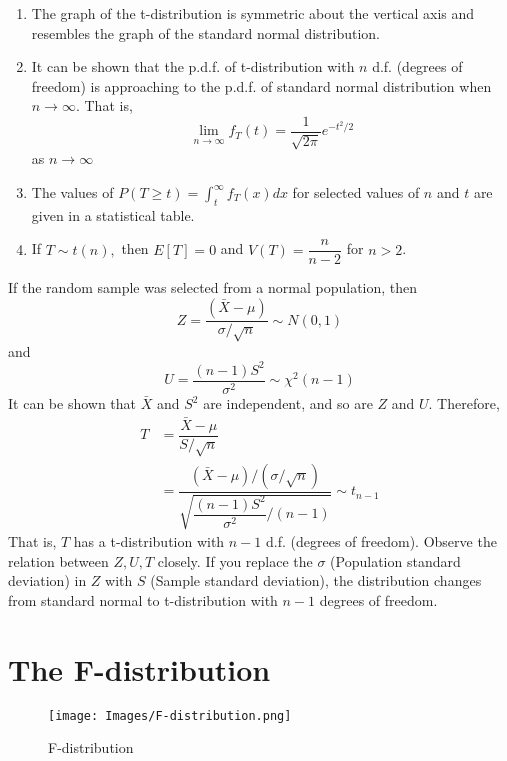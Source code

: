 \begin{note}
\end{note}
\begin{enumerate}
    \item The graph of the t-distribution is symmetric about the vertical axis and resembles the graph of the standard normal distribution.
    \item It can be shown that the p.d.f. of t-distribution with $n$ d.f. (degrees of freedom) is approaching to the p.d.f. of standard normal distribution when $n \xrightarrow{} \infty$. That is, 
    $$
    \lim_{n \xrightarrow{} \infty} f_T(t) = \dfrac{1}{\sqrt{2\pi}} e^{-t^2 / 2}
    $$ as $n \xrightarrow{} \infty$
    \item The values of $P(T \geq t) = \int_{t}^{\infty} f_T(x) dx$ for selected values of $n$ and $t$ are given in a statistical table.
    \item If $T \sim t(n),$ then $E[T] = 0$ and $V(T) = \dfrac{n}{n - 2}$ for $n > 2$.
\end{enumerate}

\begin{note}
\end{note}
If the random sample was selected from a normal population, then
$$
Z = \dfrac{(\bar{X} - \mu)}{\sigma/\sqrt{n}} \sim N(0,1)
$$ and
$$
U = \dfrac{(n-1)S^2}{\sigma^2} \sim \chi^2(n-1)
$$
It can be shown that $\bar{X}$ and $S^2$ are independent, and so are $Z$ and $U$.
Therefore, 
\begin{equation*}
    \begin{split}
        T &= \dfrac{\bar{X} - \mu }{S/\sqrt{n}} \\
        &= \dfrac{(\bar{X} - \mu)/(\sigma/\sqrt{n})}{\sqrt{\dfrac{(n-1)S^2}{\sigma^2}/(n-1)}} \sim t_{n-1}
    \end{split}
\end{equation*}
That is, $T$ has a t-distribution with $n - 1$ d.f. (degrees of freedom).
Observe the relation between $Z, U, T$ closely. If you replace the $\sigma$ (Population standard deviation) in $Z$ with $S$ (Sample standard deviation), the distribution changes from standard normal to t-distribution with $n - 1$ degrees of freedom.
\section{The F-distribution}
\begin{figure}
    \centering
    \texttt{[image: Images/F-distribution.png]}
    \caption{F-distribution}
    \label{fig:my_label}
\end{figure}

